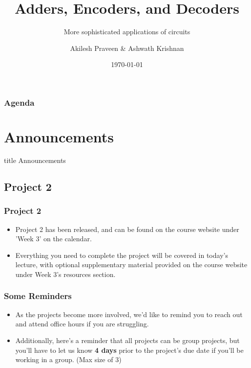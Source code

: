 \documentclass{beamer}
\title{Adders, Encoders, and Decoders}
\subtitle{More sophisticated applications of circuits}
\author[A Praveen \& A Krishnan]{Akilesh Praveen \& Ashwath Krishnan}
\institute{UMD}
\date{\today}
\begin{document}
    \begin{frame}
        \titlepage
    \end{frame}
    
    \begin{frame}
        \frametitle{Agenda}
        \tableofcontents
    \end{frame}
    
    \section{Announcements}
    
        \begin{frame}
                \vfill
                \centering
                \begin{beamercolorbox}[sep=8pt,center,shadow=true,rounded=true]{title}
                    Announcements\par%
                \end{beamercolorbox}
                \vfill
             \end{frame}
    
        \subsection{Project 2}
        
            
            
            \begin{frame}
                \frametitle{Project 2}
                \begin{itemize}
                    \item Project 2 has been released, and can be found on the course website under 'Week 3' on the calendar.
                    \item Everything you need to complete the project will be covered in today's lecture, with optional supplementary material provided on the course website under Week 3's resources section.
                    
                \end{itemize}
            \end{frame}
            
            \begin{frame}
            	\frametitle{Some Reminders}
            	\begin{itemize}
            		\item As the projects become more involved, we'd like to remind you to reach out and attend office hours if you are struggling.
                    \item Additionally, here's a reminder that all projects can be group projects, but you'll have to let us know \textbf{4 days} prior to the project's due date if you'll be working in a group. (Max size of 3)
            	\end{itemize}
            	
            \end{frame}
        
\end{document}
